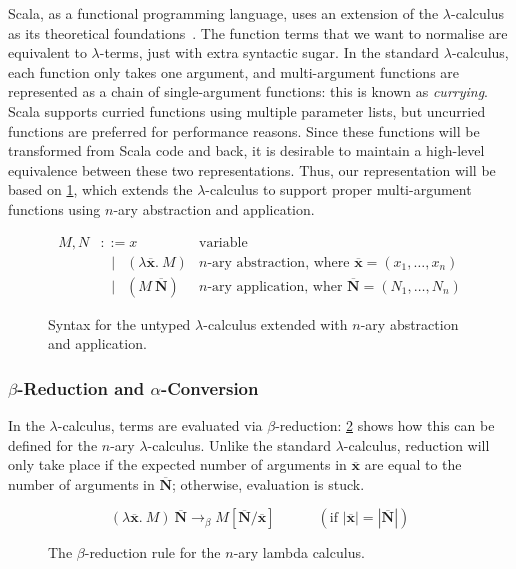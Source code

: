 \documentclass[../../../main.tex]{subfiles}
\begin{document}
Scala, as a functional programming language, uses an extension of the $\lambda$-calculus~\cite{church_lambda_1936} as its theoretical foundations~\cite{cremet_core_2006,amin_essence_2016}.
The function terms that we want to normalise are equivalent to $\lambda$-terms, just with extra syntactic sugar.
In the standard $\lambda$-calculus, each function only takes one argument, and multi-argument functions are represented as a chain of single-argument functions: this is known as \emph{currying}.
Scala supports curried functions using multiple parameter lists, but uncurried functions are preferred for performance reasons.
Since these functions will be transformed from Scala code and back, it is desirable to maintain a high-level equivalence between these two representations.
Thus, our representation will be based on \cref{fig:lambda-calculus}, which extends the $\lambda$-calculus to support proper multi-argument functions using $n$-ary abstraction and application.

\begin{figure}
\begin{align*}
M, N &\mathrel{::=} x & \text{variable} \\
&\mathrel{\enspace\mid\enspace} (\lambda \overline{\mathbf{x}}.\ M) & \text{$n$-ary abstraction, where } \overline{\mathbf{x}} = (x_1, \ldots, x_n) \\
&\mathrel{\enspace\mid\enspace} (M\ \overline{\mathbf{N}}) & \text{$n$-ary application, wher } \overline{\mathbf{N}} = (N_1, \ldots, N_n)
\end{align*}
\caption{Syntax for the untyped $\lambda$-calculus extended with $n$-ary abstraction and application.}
\label{fig:lambda-calculus}
\end{figure}

\subsubsection{$\beta$-Reduction and $\alpha$-Conversion}
In the $\lambda$-calculus, terms are evaluated via $\beta$-reduction: \cref{fig:beta-reduction} shows how this can be defined for the $n$-ary $\lambda$-calculus.
Unlike the standard $\lambda$-calculus, reduction will only take place if the expected number of arguments in $\overline{\mathbf{x}}$ are equal to the number of arguments in $\overline{\mathbf{N}}$; otherwise, evaluation is stuck.

\begin{figure}[htbp]
\begin{equation*}
(\lambda \overline{\mathbf{x}} .\ M)\ \overline{\mathbf{N}} \rightarrow_\beta M[\overline{\mathbf{N}}/\overline{\mathbf{x}}] \hspace{3em} (\text{if } | \overline{\mathbf{x}} | = | \overline{\mathbf{N}} |)
\end{equation*}
\caption{The $\beta$-reduction rule for the $n$-ary lambda calculus.}
\label{fig:beta-reduction}
\end{figure}
\end{document}
